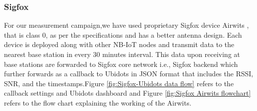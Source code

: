 \documentclass[12pt]{article}
\begin{document}
\subsubsection{Sigfox}\label{sigfox experimental setup}
For our measurement campaign,we have used proprietary Sigfox device Airwits \cite{airwits}, that is class 0, as per the specifications and has a better antenna design. Each device is deployed along with other NB-IoT nodes and transmit data to the nearest base station in every 30 minutes interval. This data upon receiving at base stations are forwarded to Sigfox core network i.e., Sigfox backend which further forwards as a callback to Ubidots \cite{ubidots} in JSON format that includes the RSSI, SNR, and the timestamps.Figure \ref{fig:Sigfox-Ubidots data flow} refers to the callback settings and Ubidots dashboard and Figure \ref{fig:Sigfox Airwits flowchart} refers to the flow chart explaining the working of the Airwits.
\end{document}
